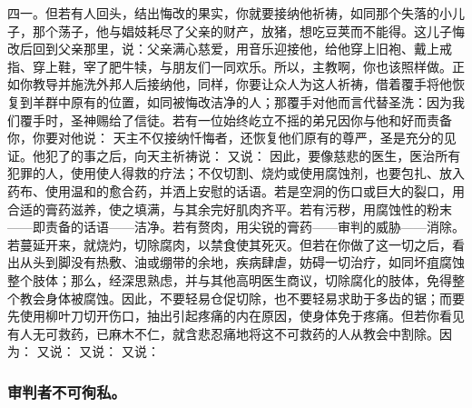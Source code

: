 四一。但若有人回头，结出悔改的果实，你就要接纳他祈祷，如同那个失落的小儿子，那个荡子，他与娼妓耗尽了父亲的财产，放猪，想吃豆荚而不能得。这儿子悔改后回到父亲那里，说：父亲满心慈爱，用音乐迎接他，给他穿上旧袍、戴上戒指、穿上鞋，宰了肥牛犊，与朋友们一同欢乐。所以，主教啊，你也该照样做。正如你教导并施洗外邦人后接纳他，同样，你要让众人为这人祈祷，借着覆手将他恢复到羊群中原有的位置，如同被悔改洁净的人；那覆手对他而言代替圣洗：因为我们覆手时，圣神赐给了信徒。若有一位始终屹立不摇的弟兄因你与他和好而责备你，你要对他说： 天主不仅接纳忏悔者，还恢复他们原有的尊严，圣是充分的见证。他犯了的事之后，向天主祈祷说： 又说： 因此，要像慈悲的医生，医治所有犯罪的人，使用使人得救的疗法；不仅切割、烧灼或使用腐蚀剂，也要包扎、放入药布、使用温和的愈合药，并洒上安慰的话语。若是空洞的伤口或巨大的裂口，用合适的膏药滋养，使之填满，与其余完好肌肉齐平。若有污秽，用腐蚀性的粉末——即责备的话语——洁净。若有赘肉，用尖锐的膏药——审判的威胁——消除。若蔓延开来，就烧灼，切除腐肉，以禁食使其死灭。但若在你做了这一切之后，看出从头到脚没有热敷、油或绷带的余地，疾病肆虐，妨碍一切治疗，如同坏疽腐蚀整个肢体；那么，经深思熟虑，并与其他高明医生商议，切除腐化的肢体，免得整个教会身体被腐蚀。因此，不要轻易仓促切除，也不要轻易求助于多齿的锯；而要先使用柳叶刀切开伤口，抽出引起疼痛的内在原因，使身体免于疼痛。但若你看见有人无可救药，已麻木不仁，就含悲忍痛地将这不可救药的人从教会中割除。因为： 又说： 又说： 又说：\par


\subsubsection{审判者不可徇私。}

